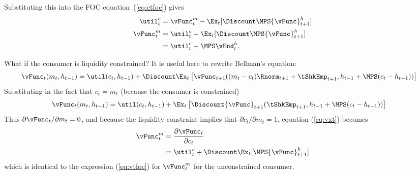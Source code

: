 \documentclass[titlepage]{\econtex}
\begin{document}
{  Substituting this into the FOC equation~(\ref{eq:ctfoc}) gives
  \begin{equation}\begin{gathered}\begin{aligned}
    \util^{c}_{t}  & = {\vFunc}_{t}^{m}-\Ex_{t}[\Discount \MPS {\vFunc}_{t+1}^{h}] \label{eq:ctfocsubx}
    \\ {\vFunc}_{t}^{m}  & = \util^{c}_{t}+\Ex_{t}[\Discount \MPS {\vFunc}_{t+1}^{h}] \label{eq:vtfoc}
    \\            & = \util^{c}_{t}+\MPS \vEnd_{t}^{h} \label{eq:vxtformula}.
  \end{aligned}\end{gathered}\end{equation}

  What if the consumer is liquidity constrained?  It is useful here to 
  rewrite Bellman's equation:
  \begin{equation}\begin{gathered}\begin{aligned}
    {\vFunc}_{t}({m}_{t},h_{t-1})  & = \util({c}_{t},h_{t-1}) +  \Discount \Ex_{t}
                                        \left[{\vFunc}_{t+1}(({m}_{t}-{c}_{t})\Rnorm_{t+1}+{\tShkEmp}_{t+1},h_{t-1}+\MPS({c}_{t}-h_{t-1}))
                                        \right] \nonumber
  \end{aligned}\end{gathered}\end{equation}
  Substituting in the fact that ${c}_{t}={m}_{t}$ (because the consumer is constrained)
  \begin{equation}\begin{gathered}\begin{aligned}
    {\vFunc}_{t}({m}_{t},h_{t-1})  & = \util({c}_{t},h_{t-1}) +  \Ex_{t}\left[\Discount
                                        {\vFunc}_{t+1}({\tShkEmp}_{t+1},h_{t-1}+\MPS({c}_{t}-h_{t-1}))\right]
                                        \nonumber
  \end{aligned}\end{gathered}\end{equation}
  Thus $\partial {\vFunc}_{t}/\partial {m}_{t} = 0$, and because the liquidity
  constraint implies that $\partial {c}_{t}/\partial {m}_{t} = 1$,
  equation (\ref{eq:vxt}) becomes
  \begin{equation}\begin{gathered}\begin{aligned}
    {\vFunc}_{t}^{m}   & =  \frac{\partial {\vFunc}_{t}}{\partial {c}_{t}}
    \\              & = \util_{t}^{c} + \Discount \Ex_{t} [\MPS {\vFunc}_{t+1}^{h}]
  \end{aligned}\end{gathered}\end{equation}
  which is identical to the expression (\ref{eq:vtfoc}) for ${\vFunc}_{t}^{m}$
  for the unconstrained consumer.

}
\end{document}
